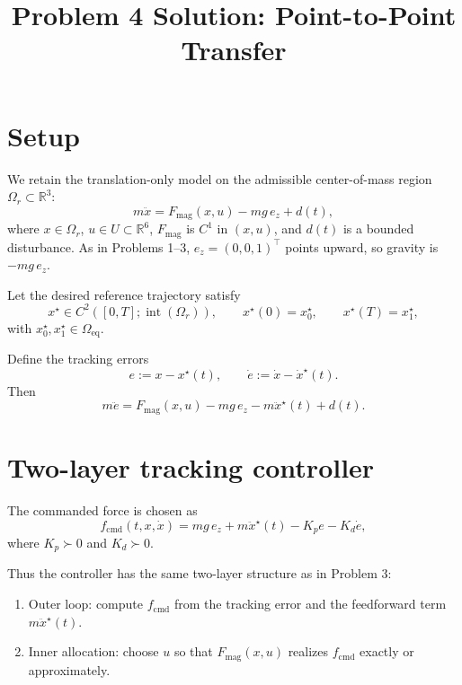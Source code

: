 \documentclass[11pt]{article}
\title{\textbf{Problem 4 Solution: Point-to-Point Transfer}}
\author{}
\date{}
\theoremstyle{definition}
\begin{document}
\maketitle

\section{Setup}

We retain the translation-only model on the admissible center-of-mass region $\Omega_r \subset \mathbb{R}^3$:
\begin{equation}
 m\ddot x = F_{\mathrm{mag}}(x,u) - mg\,e_z + d(t),
 \label{eq:plant}
\end{equation}
where $x\in\Omega_r$, $u\in U\subset\mathbb{R}^6$, $F_{\mathrm{mag}}$ is $C^1$ in $(x,u)$, and $d(t)$ is a bounded disturbance. As in Problems 1--3, $e_z=(0,0,1)^\top$ points upward, so gravity is $-mg\,e_z$.

Let the desired reference trajectory satisfy
\begin{equation}
 x^\star \in C^2([0,T];\operatorname{int}(\Omega_r)),
 \qquad x^\star(0)=x_0^\star,
 \qquad x^\star(T)=x_1^\star,
 \label{eq:traj}
\end{equation}
with $x_0^\star,x_1^\star\in\Omega_{\mathrm{eq}}$.

Define the tracking errors
\begin{equation}
 e := x-x^\star(t),
 \qquad \dot e := \dot x - \dot x^\star(t).
 \label{eq:error}
\end{equation}
Then
\begin{equation}
 m\ddot e = F_{\mathrm{mag}}(x,u) - mg\,e_z - m\ddot x^\star(t) + d(t).
 \label{eq:error_dynamics_raw}
\end{equation}

\section{Two-layer tracking controller}

The commanded force is chosen as
\begin{equation}
 f_{\mathrm{cmd}}(t,x,\dot x)
 = mg\,e_z + m\ddot x^\star(t) - K_p e - K_d \dot e,
 \label{eq:fcmd_pd}
\end{equation}
where $K_p\succ 0$ and $K_d\succ 0$.

Thus the controller has the same two-layer structure as in Problem 3:
\begin{enumerate}[label=\textbf{Layer \arabic*:}, leftmargin=1.5em]
  \item Outer loop: compute $f_{\mathrm{cmd}}$ from the tracking error and the feedforward term $m\ddot x^\star(t)$.
  \item Inner allocation: choose $u$ so that $F_{\mathrm{mag}}(x,u)$ realizes $f_{\mathrm{cmd}}$ exactly or approximately.
\end{enumerate}
\end{document}
